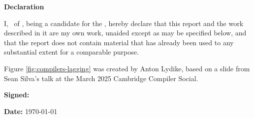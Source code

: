 \vspace{\fill}
\onehalfspacing
\makeatletter
\textbf{\Huge Declaration}
\vspace{40pt}

I, \@author\ of \college, being a candidate for the \course, hereby
declare that this report and the work described in it are my own work,
unaided except as may be specified below, and that the report does not
contain material that has already been used to any substantial extent
for a comparable purpose.

Figure \ref{fig:compilers-lagging} was created by Anton Lydike, based on a slide from Sean Silva's talk at the March 2025 Cambridge Compiler Social.

\bigskip 
\textbf{Signed:} \@author

\bigskip
\textbf{Date:} \today
\vspace{\fill}


\makeatother\fi
